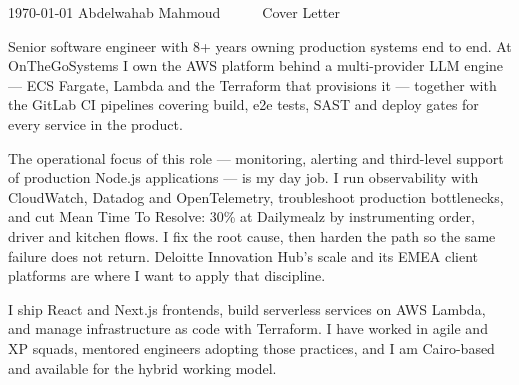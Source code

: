 \documentclass[11pt, a4paper]{awesome-cv}
\begin{document}
\makecvheader[R]

\makecvfooter
  {\today}
  {Abdelwahab Mahmoud~~~\textperiodcentered~~~Cover Letter}
  {}

\makelettertitle

\begin{cvletter}

Senior software engineer with 8+ years owning production systems end to end. At OnTheGoSystems I own the AWS platform behind a multi-provider LLM engine --- ECS Fargate, Lambda and the Terraform that provisions it --- together with the GitLab CI pipelines covering build, e2e tests, SAST and deploy gates for every service in the product.

The operational focus of this role --- monitoring, alerting and third-level support of production Node.js applications --- is my day job. I run observability with CloudWatch, Datadog and OpenTelemetry, troubleshoot production bottlenecks, and cut Mean Time To Resolve: 30\% at Dailymealz by instrumenting order, driver and kitchen flows. I fix the root cause, then harden the path so the same failure does not return. Deloitte Innovation Hub's scale and its EMEA client platforms are where I want to apply that discipline.

I ship React and Next.js frontends, build serverless services on AWS Lambda, and manage infrastructure as code with Terraform. I have worked in agile and XP squads, mentored engineers adopting those practices, and I am Cairo-based and available for the hybrid working model.

\end{cvletter}


\makeletterclosing
\end{document}
